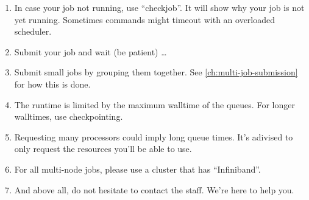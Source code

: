 \begin{enumerate}
  \ifgent\else\item  In case your job not running, use ``checkjob''.  It will show why your
    job is not yet running. Sometimes commands might timeout with an overloaded
    scheduler.\fi

  \item  Submit your job and wait (be patient) \ldots

  \item  Submit small jobs by grouping them together. See \autoref{ch:multi-job-submission}
    for how this is done.

  \item  The runtime is limited by the maximum walltime of the queues. For
    longer walltimes, use checkpointing.

  \item  Requesting many processors could imply long queue times. It's adivised
    to only request the resources you'll be able to use.

  \item  For all multi-node jobs, please use a cluster that has ``Infiniband''.

  \item  And above all, do not hesitate to contact the \hpc staff. We're
    here to help you.
\end{enumerate}

